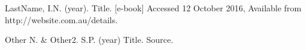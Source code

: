 \documentclass[11pt, a4paper]{article}
\begin{document}
\newpage
{} %


    
     

\newpage
\begin{thebibliography}{2}
     LastName, I.N. (year). Title. [e-book] Accessed 12 October 2016, Available from http://website.com.au/details.
    
     Other N. \& Other2. S.P. (year) Title. Source.
\end{thebibliography}

\newpage
\begin{appendix}

    
    
        
        
\end{appendix}
\end{document}
